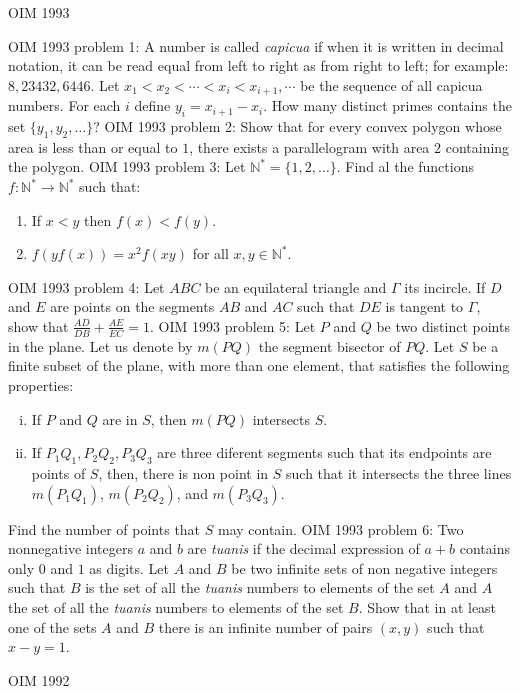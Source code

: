 OIM 1993 

OIM 1993 problem 1:  A number is called \textit{capicua} if when it is written in decimal notation, it can be read equal from left to right as from right to left; for example: $8, 23432, 6446$. Let $x_1<x_2<\cdots<x_i<x_{i+1},\cdots$ be the sequence of all capicua numbers. For each $i$ define $y_i=x_{i+1}-x_i$. How many distinct primes contains the set $\{y_1,y_2, \ldots\}$? 
OIM 1993 problem 2:  Show that for every convex polygon whose area is less than or equal to $1$, there exists a parallelogram with area $2$ containing the polygon. 
OIM 1993 problem 3:  Let $\mathbb{N}^*=\{1,2,\ldots\}$. Find al the functions $f: \mathbb{N}^*\rightarrow \mathbb{N}^*$ such that:
\begin{enumerate}[(1)]
  \item If $x<y$ then $f(x)<f(y)$.
  \item $f\left(yf(x)\right)=x^2f(xy)$ for all $x,y \in\mathbb{N}^*$.
\end{enumerate} 
OIM 1993 problem 4:  Let $ABC$ be an equilateral triangle and $\Gamma$ its incircle. If $D$ and $E$ are points on the segments $AB$ and $AC$ such that $DE$ is tangent to $\Gamma$, show that $\frac{AD}{DB}+\frac{AE}{EC}=1$. 
OIM 1993 problem 5:  Let $P$ and $Q$ be two distinct points in the plane. Let us denote by $m(PQ)$ the segment bisector of $PQ$. Let $S$ be a finite subset of the plane, with more than one element, that satisfies the following properties:
\begin{enumerate}[(i)]
  \item If $P$ and $Q$ are in $S$, then $m(PQ)$ intersects $S$.
  \item If $P_1Q_1, P_2Q_2, P_3Q_3$ are three diferent segments such that its endpoints are points of $S$, then, there is non point in $S$ such that it intersects the three lines $m(P_1Q_1)$, $m(P_2Q_2)$, and $m(P_3Q_3)$.
\end{enumerate}
Find the number of points that $S$ may contain. 
OIM 1993 problem 6:  Two nonnegative integers $a$ and $b$ are \textit{tuanis} if the decimal expression of $a+b$ contains only $0$ and $1$ as digits. Let $A$ and $B$ be two infinite sets of non negative integers such that $B$ is the set of all the \textit{tuanis} numbers to elements of the set $A$ and $A$ the set of all the \textit{tuanis} numbers to elements of the set $B$. Show that in at least one of the sets $A$ and $B$ there is an infinite number of pairs $(x,y)$ such that $x-y=1$. 

OIM 1992 

